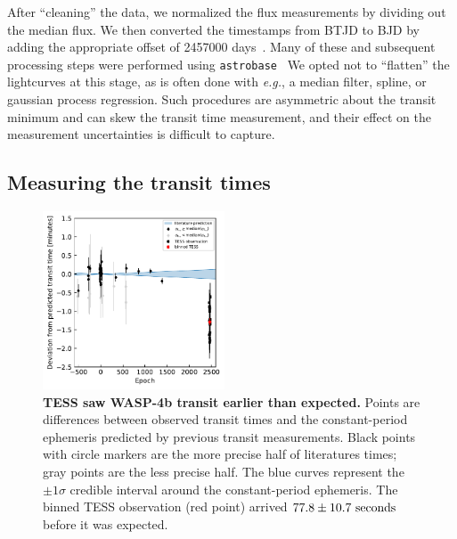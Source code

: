 \documentclass[12pt,twocolumn,tighten]{aastex62}
\begin{document}
After ``cleaning'' the data, we normalized the flux measurements by
dividing out the median flux.  We then converted the timestamps from
BTJD to BJD by adding the appropriate offset of 2457000
days~\citep{tess_data_product_description_2018}.  Many of these and
subsequent processing steps were performed using
\texttt{astrobase}~\citep{bhatti_astrobase_2018} We opted not to
``flatten'' the lightcurves at this stage, as is often done with {\it
e.g.}, a median filter, spline, or gaussian process regression.  Such
procedures are asymmetric about the transit minimum and can skew the
transit time measurement, and their effect on the measurement
uncertainties is difficult to capture.



\subsection{Measuring the transit times}


\begin{figure}[t]
    \begin{center}
        \leavevmode
        \includegraphics[width=0.48\textwidth]{f2.pdf}
    \end{center}
    \vspace{-0.5cm}
    \caption{
        {\bf TESS saw WASP-4b transit earlier than expected.}
        Points are differences between observed transit times and the
        constant-period ephemeris predicted by previous transit
        measurements.  Black points with circle markers are the more
        precise half of literatures times; gray points are the less
        precise half.  The blue curves represent the $\pm 1\sigma$
        credible interval around the constant-period ephemeris.  The
        binned TESS observation (red point) arrived $77.8 \pm 10.7\
        {\rm seconds}$ before it was expected.
        \label{fig:arrived_early}
    }
\end{figure}
\end{document}
